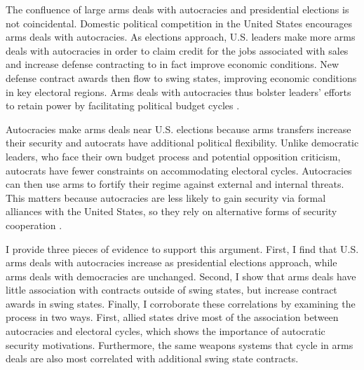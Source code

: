 \documentclass[12pt]{article}
\begin{document}
The confluence of large arms deals with autocracies and presidential elections is not coincidental.
Domestic political competition in the United States encourages arms deals with autocracies. 
As elections approach, U.S. leaders make more arms deals with autocracies in order to claim credit for the jobs associated with sales and increase defense contracting to in fact improve economic conditions.
New defense contract awards then flow to swing states, improving economic conditions in key electoral regions.
Arms deals with autocracies thus bolster leaders' efforts to retain power by facilitating political budget cycles \citep{Tufte1978, Mintz1988, Mayer1995, DerouenHeo2000, Becker2021}. 


Autocracies make arms deals near U.S. elections because arms transfers increase their security and autocrats have additional political flexibility. 
Unlike democratic leaders, who face their own budget process and potential opposition criticism, autocrats have fewer constraints on accommodating electoral cycles.
Autocracies can then use arms to fortify their regime against external and internal threats.
This matters because autocracies are less likely to gain security via formal alliances with the United States, so they rely on alternative forms of security cooperation \citep{McManusYarhi-Milo2017}.



I provide three pieces of evidence to support this argument.
First, I find that U.S. arms deals with autocracies increase as presidential elections approach, while arms deals with democracies are unchanged. 
Second, I show that arms deals have little association with contracts outside of swing states, but increase contract awards in swing states. 
Finally, I corroborate these correlations by examining the process in two ways.
First, allied states drive most of the association between autocracies and electoral cycles, which shows the importance of autocratic security motivations. 
Furthermore, the same weapons systems that cycle in arms deals are also most correlated with additional swing state contracts.


\end{document}
